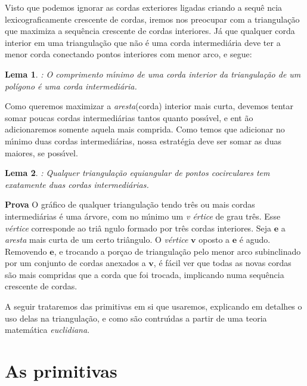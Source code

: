 \documentclass[12pt,a4paper]{book}
\newtheorem{Lem}{Lema}
\begin{document}
Visto que podemos ignorar as cordas exteriores ligadas criando a sequ\^{e}%
ncia lexicograficamente crescente de cordas, iremos nos preocupar com a
triangula\c{c}\~{a}o que maximiza a sequ\^{e}ncia crescente de cordas
interiores. J\'{a} que qualquer corda interior em uma triangula\c{c}\~{a}o
que n\~{a}o \'{e} uma corda intermedi\'{a}ria deve ter a menor corda
conectando pontos interiores com menor arco, e segue:

\begin{Lem}
: O comprimento m\'{\i}nimo de uma corda interior da triangula\c{c}\~{a}o de
um \textit{pol\'igono} \'{e} uma corda intermedi\'{a}ria.
\end{Lem}

Como queremos maximizar a \textit{aresta}(corda) interior mais curta, devemos tentar
somar poucas cordas intermedi\'{a}rias tantos quanto poss\'{\i}vel, e ent%
\~{a}o adicionaremos somente aquela mais comprida. Como temos que adicionar
no m\'{\i}nimo duas cordas intermedi\'{a}rias, nossa estrat\'{e}gia deve ser
somar as duas maiores, se poss\'{\i}vel.

\begin{Lem}
: Qualquer triangula\c{c}\~{a}o equiangular de pontos cocirculares tem
exatamente duas cordas intermedi\'{a}rias.
\end{Lem}


{\bf Prova}
 O gr\'{a}fico de qualquer triangula\c{c}\~{a}o tendo tr\^{e}s ou mais
cordas intermedi\'{a}rias \'{e} uma \'{a}rvore, com no m\'{\i}nimo um \textit{v%
\'{e}rtice} de grau tr\^{e}s. Esse \textit{v\'{e}rtice} corresponde ao tri\^{a}%
ngulo formado por tr\^{e}s cordas interiores. Seja $\mathbf{e}$ a \textit{aresta} mais
curta de um certo tri\^{a}ngulo. O \textit{v\'{e}rtice} $\mathbf{v}$ oposto 
a $\mathbf{e}$ \'{e} agudo. Removendo $\mathbf{e}$, e trocando a por\c{c}ao de
triangula\c{c}\~{a}o pelo menor arco subinclinado por um conjunto de cordas anexados
a $\mathbf{v}$, \'{e} f\'{a}cil ver que todas as novas cordas s\~{a}o mais
compridas que a corda que foi trocada, implicando numa sequ\^{e}ncia
crescente de cordas.


A seguir trataremos das primitivas em si que usaremos, explicando em
detalhes o uso delas na triangula\c{c}\~{a}o, e como s\~{a}o contru\'{\i}das
a partir de uma teoria matem\'{a}tica \textit{euclidiana}.

\section{As primitivas}
\end{document}
